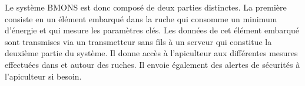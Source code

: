 Le système BMONS est donc composé de deux parties distinctes. La première consiste en un élément embarqué dans la ruche qui consomme un minimum d'énergie et qui mesure les paramètres clés. Les données de cet élément embarqué sont transmises via un transmetteur sans fils à un serveur qui constitue la deuxième partie du système. Il donne accès à l'apiculteur aux différentes mesures effectuées dans et autour des ruches. Il envoie également des alertes de sécurités à l'apiculteur si besoin. 